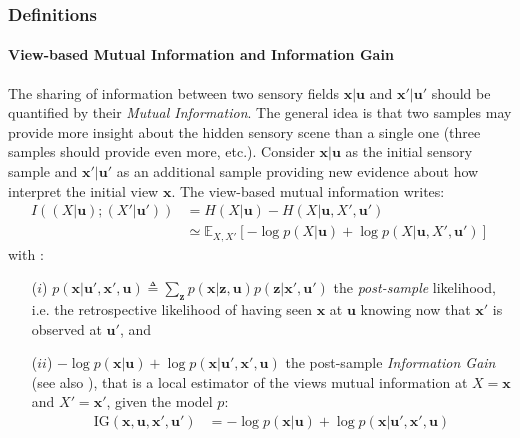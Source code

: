 \documentclass[12pt,twoside,openright]{article}
\begin{document}
\subsubsection{Definitions}

\paragraph{View-based Mutual Information and Information Gain}
The sharing of information between two sensory fields $\boldsymbol{x}|\boldsymbol{u}$ and $\boldsymbol{x}'|\boldsymbol{u}'$  should be quantified by their \emph{Mutual Information}. The general idea is that two samples may provide more insight about the hidden sensory scene than a single one (three samples should provide even more, etc.). 
{\color{Purple} Consider $\boldsymbol{x}|\boldsymbol{u}$ as the initial sensory sample and $\boldsymbol{x}'|\boldsymbol{u}'$ as an additional sample providing new evidence about how interpret the initial view $\boldsymbol{x}$}.
The view-based mutual information writes:
\begin{align}
	I((X| \boldsymbol{u}); (X'| \boldsymbol{u}')) &= H(X| \boldsymbol{u}) - H(X| \boldsymbol{u}, X', \boldsymbol{u}')\label{eq:mutual-info}\\
	&\simeq \mathbb{E}_{X,X'} \left[-\log p(X| \boldsymbol{u}) + \log p(X| \boldsymbol{u}, X', \boldsymbol{u}')\right] 
\end{align}
with :
\begin{itemize}
	\item[($i$)] $ p(\boldsymbol{x}| \boldsymbol{u}', \boldsymbol{x}', \boldsymbol{u}) \triangleq \sum_{\boldsymbol{z}} p(\boldsymbol{x}|\boldsymbol{z}, \boldsymbol{u}) p(\boldsymbol{z}|\boldsymbol{x}', \boldsymbol{u}')$ 
	the \emph{post-sample} likelihood, i.e. the retrospective likelihood of having seen $\boldsymbol{x}$ at $\boldsymbol{u}$ knowing now that $\boldsymbol{x}'$ is observed at $\boldsymbol{u}'$, and
	\item[($ii$)] 
	$-\log p(\boldsymbol{x}| \boldsymbol{u}) + \log p(\boldsymbol{x}| \boldsymbol{u}', \boldsymbol{x}', \boldsymbol{u})$ the post-sample
	\emph{Information Gain} (see also \citet{tishby2011information}), that is a local estimator of the views mutual information at $X = \boldsymbol{x}$ and $X' = \boldsymbol{x}'$, {\color{Purple} given the model $p$}:
	\begin{align}
		\text{IG}(\boldsymbol{x},\boldsymbol{u}, \boldsymbol{x}', \boldsymbol{u}') 
		&= -\log p(\boldsymbol{x}| \boldsymbol{u}) + \log p(\boldsymbol{x}| \boldsymbol{u}', \boldsymbol{x}', \boldsymbol{u}) \label{eq:info-gain}
	\end{align}
\end{itemize}
\end{document}
